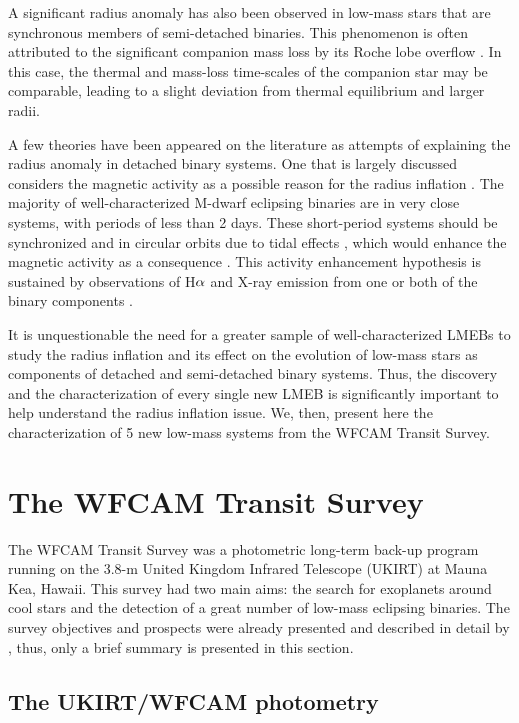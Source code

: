 \documentclass[fleqn,usenatbib]{mnras}
\begin{document}
A significant radius anomaly has also been observed in low-mass stars that are synchronous members of semi-detached binaries. This phenomenon is often attributed to the significant companion mass loss by its Roche lobe overflow \citep{Knigge11}. In this case, the thermal and mass-loss time-scales of the companion star may be comparable, leading to a slight deviation from thermal equilibrium and larger radii. 

A few theories have been appeared on the literature as attempts of explaining the radius anomaly in detached binary systems. One that is largely discussed considers the magnetic activity as a possible reason for the radius inflation \citep{Torres06,Chabrier07}. The majority of well-characterized M-dwarf eclipsing binaries are in very close systems, with periods of less than 2 days. These short-period systems should be synchronized and in circular orbits due to tidal effects \citep{Zahn77}, which would enhance the magnetic activity as a consequence \citep{Chabrier07,Kraus11,Birkby12}. This activity enhancement hypothesis is sustained by observations of H${\rm \alpha}$ and X-ray emission from one or both of the binary components \citep[e.g., ][]{Chabrier07,Huelamo09,Kraus11}.

It is unquestionable the need for a greater sample of well-characterized LMEBs to study the radius inflation and its effect on the evolution of low-mass stars as components of detached and semi-detached binary systems. Thus, the discovery and the characterization of every single new LMEB is significantly important to help understand the radius inflation issue. We, then, present here the characterization of 5 new low-mass systems from the WFCAM Transit Survey.


\section{The WFCAM Transit Survey}
\label{sec:photobs}

The WFCAM Transit Survey \citep[WTS, ][]{Birkby11,Kovacs13} was a photometric long-term back-up program running on the 3.8-m United Kingdom Infrared Telescope (UKIRT) at Mauna Kea, Hawaii. This survey had two main aims: the search for exoplanets around cool stars and the detection of a great number of low-mass eclipsing binaries. The survey objectives and prospects were already presented and described in detail by \citet{Birkby11,Birkby12,Kovacs13}, thus, only a brief summary is presented in this section.


\subsection{The UKIRT/WFCAM photometry}
\end{document}
